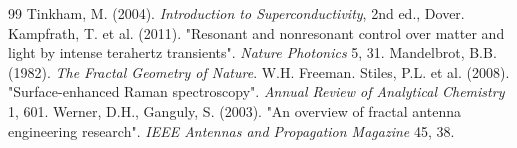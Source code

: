 \documentclass[11pt,a4paper]{article}
\theoremstyle{remark}
\begin{document}
\begin{thebibliography}{99}
		 Tinkham, M. (2004). \textit{Introduction to Superconductivity}, 2nd ed., Dover.
		 Kampfrath, T. et al. (2011). "Resonant and nonresonant control over matter and light by intense terahertz transients". \textit{Nature Photonics} 5, 31.
		 Mandelbrot, B.B. (1982). \textit{The Fractal Geometry of Nature}. W.H. Freeman.
		 Stiles, P.L. et al. (2008). "Surface-enhanced Raman spectroscopy". \textit{Annual Review of Analytical Chemistry} 1, 601.
		 Werner, D.H., Ganguly, S. (2003). "An overview of fractal antenna engineering research". \textit{IEEE Antennas and Propagation Magazine} 45, 38.
	\end{thebibliography}
	
\end{document}
